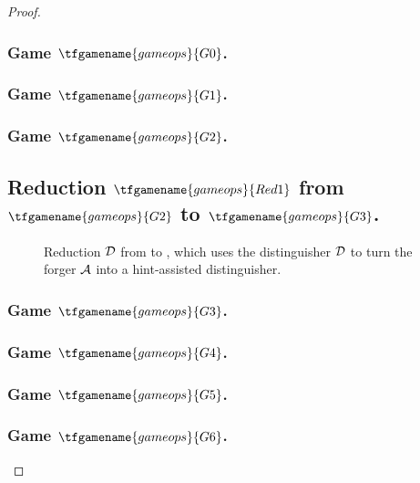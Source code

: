 \begin{proof}
\subsubsection*{Game $\tfgamename{gameops}{G0}$.}


\subsubsection*{Game $\tfgamename{gameops}{G1}$.}



\subsubsection*{Game $\tfgamename{gameops}{G2}$.}


\subsection*{Reduction $\tfgamename{gameops}{Red1}$ from $\tfgamename{gameops}{G2}$ to $\tfgamename{gameops}{G3}$.}


\begin{figure}
    \centering 
    \caption{Reduction $\mathcal{D}$ from 
         to , which uses the distinguisher $\mathcal{D}$ to turn the forger $\mathcal{A}$ into a hint-assisted \wHVZK distinguisher.
    }\label{fig:reduction}
\end{figure}


\subsubsection*{Game $\tfgamename{gameops}{G3}$.}


\subsubsection*{Game $\tfgamename{gameops}{G4}$.}


\subsubsection*{Game $\tfgamename{gameops}{G5}$.}


\subsubsection*{Game $\tfgamename{gameops}{G6}$.}



\end{proof}
